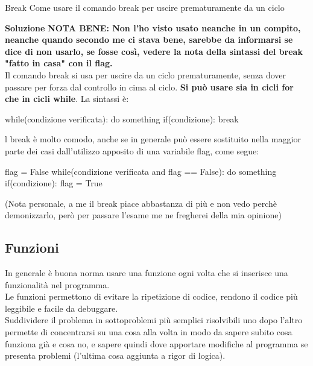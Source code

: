 \documentclass[10pt]{article}
\makeatletter
\newcommand{\<}{\langle}
\renewcommand{\>}{\rangle}
\renewenvironment{proof}[1][\proofname] {\par\pushQED{\qed}
\renewcommand*{\proofname}{Soluzione}
{\normalfont\sffamily\bfseries\topsep6\p@\@plus6\p@\relax #1\@addpunct{.} }}{\popQED\endtrivlist\@endpefalse}
\theoremstyle{mystyle}{\newtheorem*{remark}{Nota}}
\theoremstyle{mystyle}{\newtheorem*{remarks}{Note}}
\theoremstyle{mystyle}{\newtheorem*{example}{Esempio}}
\theoremstyle{mystyle}{\newtheorem*{examples}{Esempi}}
\theoremstyle{definition}{\newtheorem*{exercise}{Exercise}}
\theoremstyle{warn}
\makeatother
\begin{document}
\begin{definition}{Break}{}
Come usare il comando break per uscire prematuramente da un ciclo
\end{definition}
\begin{proof}
\textbf{NOTA BENE: Non l'ho visto usato neanche in un compito, neanche quando secondo me ci stava bene, sarebbe da informarsi se dice di non usarlo, se fosse così, vedere la nota della sintassi del break "fatto in casa" con il flag.}\\
Il comando break si usa per uscire da un ciclo prematuramente, senza dover passare per forza dal controllo in cima al ciclo. \textbf{Si può usare sia in cicli for che in cicli while}. La sintassi è:
\begin{python}
while(condizione verificata):
    do something
    if(condizione):
        break
\end{python}
\end{proof}
\begin{remark}
l break è molto comodo, anche se in generale può essere sostituito nella maggior parte dei casi dall'utilizzo apposito di una variabile flag, come segue:
\begin{python}
flag = False
while(condizione verificata and flag == False):
    do something
    if(condizione):
        flag = True
\end{python}
    (Nota personale, a me il break piace abbastanza di più e non vedo perchè demonizzarlo, però per passare l'esame me ne fregherei della mia opinione)
\end{remark}

\newpage
\subsection{Funzioni}
\label{funzioni}
In generale è buona norma usare una funzione ogni volta che si inserisce una funzionalità nel programma.\\
Le funzioni permettono di evitare la ripetizione di codice, rendono il codice più leggibile e facile da debuggare.\\
Suddividere il problema in sottoproblemi più semplici risolvibili uno dopo l'altro permette di concentrarsi su una cosa alla volta in modo da sapere subito cosa funziona già e cosa no, e sapere quindi dove apportare modifiche al programma se presenta problemi (l'ultima cosa aggiunta a rigor di logica).
\end{document}
